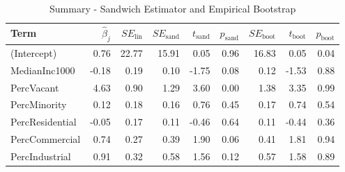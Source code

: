 \begin{table}[ht]
\centering
\begin{tabular}{lrrrrrrrr}
  \hline
Term & $\widehat{\beta}_{j}$ & $SE_{\text{lin}}$ & $SE_{\text{sand}}$ & $t_{\text{sand}}$ & $p_{\text{sand}}$ & $SE_{\text{boot}}$ & $t_{\text{boot}}$ & $p_{\text{boot}}$ \\ 
  \hline
(Intercept) & 0.76 & 22.77 & 15.91 & 0.05 & 0.96 & 16.83 & 0.05 & 0.04 \\ 
  MedianInc1000 & -0.18 & 0.19 & 0.10 & -1.75 & 0.08 & 0.12 & -1.53 & 0.88 \\ 
  PercVacant & 4.63 & 0.90 & 1.29 & 3.60 & 0.00 & 1.38 & 3.35 & 0.99 \\ 
  PercMinority & 0.12 & 0.18 & 0.16 & 0.76 & 0.45 & 0.17 & 0.74 & 0.54 \\ 
  PercResidential & -0.05 & 0.17 & 0.11 & -0.46 & 0.64 & 0.11 & -0.44 & 0.36 \\ 
  PercCommercial & 0.74 & 0.27 & 0.39 & 1.90 & 0.06 & 0.41 & 1.81 & 0.94 \\ 
  PercIndustrial & 0.91 & 0.32 & 0.58 & 1.56 & 0.12 & 0.57 & 1.58 & 0.89 \\ 
   \hline
\end{tabular}
\caption{Summary - Sandwich Estimator and Empirical Bootstrap} 
\end{table}
